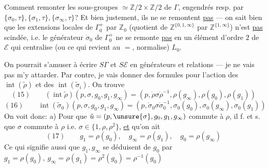 Comment remonter les sous-groupes  $\simeq\mathbb Z/2\times\mathbb Z/2$ de $\Gamma$, engendrés resp. par $\{\sigma_0,\tau\},\{\sigma_1,\tau\},\{\sigma_\infty,\tau\}$? Et bien justement, ils ne se remontent \uline{pas} --- on sait bien que les extensions locales de $\Gamma_0^+$  par $\mathbb Z_0$ (quotient de $\mathbb Z^{\{0,1,\infty\}}$ par $\mathbb Z^{\{1,\infty\}}$) n'est \uline{pas} scindée, i.e. le générateur $\dot\sigma_0$ de $\Gamma_0^+$ ne se remonte \uline{pas} en un élément d'ordre $2$ de $\mathcal E$ qui centralise (ou ce qui revient au $=$, normalise) $L_0$.

On pourrait s'amuser à écrire $S\Gamma$ et $S\mathcal E$ en générateurs et relations --- je ne vais pas m'y attarder. Par contre, je vais donner des formules pour l'action des $\operatorname{int}(\tilde\rho)$ et des $\operatorname{int}(\tilde\sigma_i)$. On trouve
\[
(15)\qquad(\operatorname{int}\tilde\rho)(p,\sigma,g_0,g_1,g_\infty)=(p,\dot\rho\sigma\dot\rho^{-1},\rho(g_\infty),\rho(g_0),\rho(g_1))
\]
\[
(16)\qquad\operatorname{int}(\tilde\sigma_0)(p,\sigma,g_0,g_1,g_\infty)=(p,\dot\sigma_0\sigma\dot\sigma_0^{-1},\sigma_0(g_0),\sigma_0(g_\infty),\sigma_0(g_1))
\]
On voit donc: a) Pour que $\tilde u=(p,\unsure{\sigma},g_0,g_1,g_\infty)$ commute à $\rho$, il f. et s. que  $\sigma$ commute à $\rho$ i.e. $\sigma\in\{1,\rho,\rho^2\}$, \uline{et} qu'on ait
\[
(17)\qquad g_1=\rho(g_0),\quad g_\infty=\rho(g_1),\quad g_0=\rho(g_\infty)
\]
Ce qui signifie aussi que $g_1,g_\infty$ se déduisent de $g_0$ par $g_1=\rho(g_0),\ g_\infty=\rho(g_1)=\rho^2(g_0)=\rho^{-1}(g_0)$
